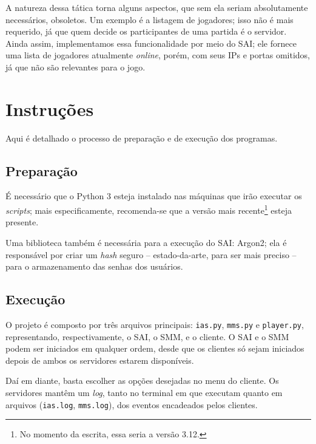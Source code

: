 \documentclass{article}
\begin{document}
\begin{multicols}{2}
    A natureza dessa tática torna alguns aspectos, que sem ela seriam absolutamente necessários, obsoletos. Um exemplo é a listagem de jogadores; isso não é mais requerido, já que quem decide os participantes de uma partida é o servidor. Ainda assim, implementamos essa funcionalidade por meio do SAI; ele fornece uma lista de jogadores atualmente \textit{online}, porém, com seus IPs e portas omitidos, já que não são relevantes para o jogo.
    
    \section{Instruções}
    
    Aqui é detalhado o processo de preparação e de execução dos programas.
    
    \subsection{Preparação}
    
    É necessário que o Python 3 esteja instalado nas máquinas que irão executar os \textit{scripts}; mais especificamente, recomenda-se que a versão mais recente\footnote{No momento da escrita, essa seria a versão 3.12.} esteja presente.
    
    Uma biblioteca também é necessária para a execução do SAI: Argon2; ela é responsável por criar um \textit{hash} seguro -- estado-da-arte, para ser mais preciso -- para o armazenamento das senhas dos usuários.
    
    \subsection{Execução}
    
    O projeto é composto por três arquivos principais: \texttt{ias.py}, \texttt{mms.py} e \texttt{player.py}, representando, respectivamente, o SAI, o SMM, e o cliente. O SAI e o SMM podem ser iniciados em qualquer ordem, desde que os clientes só sejam iniciados depois de ambos os servidores estarem disponíveis.
    
    Daí em diante, basta escolher as opções desejadas no menu do cliente. Os servidores mantêm um \textit{log}, tanto no terminal em que executam quanto em arquivos (\texttt{ias.log}, \texttt{mms.log}), dos eventos encadeados pelos clientes.


\end{multicols}
\end{document}
